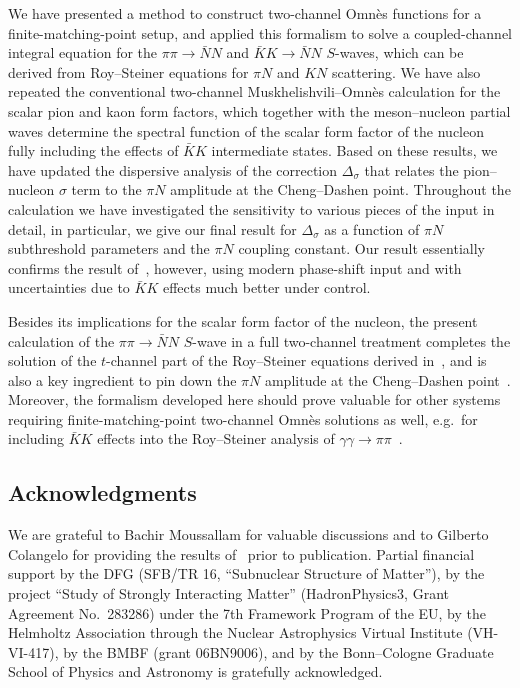 \documentclass[11pt]{article}%
\begin{document}
We have presented a method to construct two-channel Omn\`es functions for a finite-matching-point setup, and applied this formalism to solve a coupled-channel integral equation for the $\pi\pi\to\bar N N$ and $\bar K K\to\bar N N$ $S$-waves, which can be derived from Roy--Steiner equations for $\pi N$ and $KN$ scattering.
We have also repeated the conventional two-channel Muskhelishvili--Omn\`es calculation for the scalar pion and kaon form factors, which together with the meson--nucleon partial waves determine the spectral function of the scalar form factor of the nucleon fully including the effects of $\bar K K$ intermediate states. 
Based on these results, we have updated the dispersive analysis of the correction $\Delta_\sigma$ that relates the pion--nucleon $\sigma$ term to the $\pi N$ amplitude at the Cheng--Dashen point. Throughout the calculation we have investigated the sensitivity to various pieces of the input in detail, in particular, we give our final result for $\Delta_\sigma$ as a function of $\pi N$ subthreshold parameters and the $\pi N$ coupling constant. 
Our result essentially confirms the result of~\cite{GLS90_FF}, however, using modern phase-shift input and with uncertainties due to $\bar K K$ effects much better under control.

Besides its implications for the scalar form factor of the nucleon, the present calculation of the $\pi\pi\to\bar N N$ $S$-wave in a full two-channel treatment completes the solution of the $t$-channel part of the Roy--Steiner equations derived in~\cite{RS_DHKM}, and is also a key ingredient to pin down the $\pi N$ amplitude at the Cheng--Dashen point~\cite{BL01,GLS90_FF,Hoehler}. Moreover, the formalism developed here should prove valuable for other systems requiring finite-matching-point two-channel Omn\`es solutions as well, e.g.\ for including $\bar K K$ effects into the Roy--Steiner analysis of $\gamma\gamma\to\pi\pi$~\cite{HPS}.


\subsection*{Acknowledgments}

We are grateful to Bachir Moussallam for valuable discussions and to Gilberto Colangelo for providing the results of~\cite{CCL:PWA} prior to publication.
Partial financial support by
the DFG (SFB/TR 16, ``Subnuclear Structure of Matter''),
by the project ``Study of Strongly Interacting Matter'' 
(HadronPhysics3, Grant Agreement No.~283286) 
under the 7th Framework Program of the EU, 
by the Helmholtz Association through the
Nuclear Astrophysics Virtual Institute (VH-VI-417), by the BMBF
(grant 06BN9006),
and by the Bonn--Cologne Graduate School of Physics and Astronomy
is gratefully acknowledged.
\end{document}
